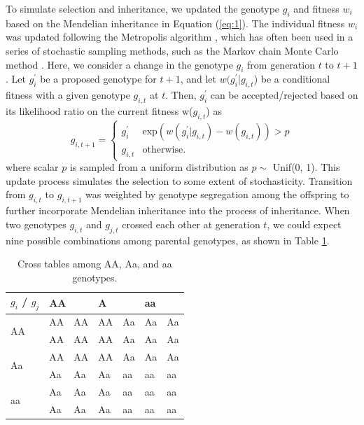 \documentclass[12pt,]{article}
\begin{document}
To simulate selection and inheritance, we updated the genotype $g_i$ and fitness $w_i$ based on the Mendelian inheritance in Equation (\ref{eq:1}). The individual fitness $w_i$ was updated following the Metropolis algorithm \citep{metropolis1953equation}, which has often been used in a series of stochastic sampling methods, such as the Markov chain Monte Carlo method \citep{bishop2006_11}. Here, we consider a change in the genotype $g_i$ from generation $t$ to $t+1$. Let $g^\prime_i$ be a proposed genotype for $t+1$, and let $w(g^\prime_i$|$g_{i,t}$) be a conditional fitness with a given genotype $g_{i,t}$ at $t$. Then, $g^\prime_i$ can be accepted/rejected based on its likelihood ratio on the current fitness w($g_{i,t}$) as
\[
  g_{i,t+1} = \begin{cases}
    g_i^\prime & \mathrm{exp}(w(g^\prime_i|g_{i,t}) - w(g_{i,t})) > p \\
    g_{i,t} & \mathrm{otherwise.}
  \end{cases}
\]
where scalar $p$ is sampled from a uniform distribution as $p \sim$ Unif(0, 1). This update process simulates the selection to some extent of stochasticity. Transition from $g_{i,t}$ to $g_{i,t+1}$ was weighted by genotype segregation among the offspring to further incorporate Mendelian inheritance into the process of inheritance. When two genotypes $g_{i,t}$ and $g_{j,t}$ crossed each other at generation $t$, we could expect nine possible combinations among parental genotypes, as shown in Table \ref{tableS1:MCMCinherit}.

\begin{table}[h]
\centering
\caption{Cross tables among AA, Aa, and aa genotypes.}
\begin{tabular}{|l|ll|ll|ll|}
\hline
$g_i$ / $g_j$             & \multicolumn{2}{l|}{AA} & \multicolumn{2}{l|}{ A } & \multicolumn{2}{l|}{aa} \\ \hline
\multirow{2}{*}{AA} & AA         & AA         & AA         & Aa         & Aa         & Aa         \\
                    & AA         & AA         & AA         & Aa         & Aa         & Aa         \\ \hline
\multirow{2}{*}{Aa} & AA         & AA         & AA         & Aa         & Aa         & Aa         \\
                    & Aa         & Aa         & Aa         & aa         & aa         & aa         \\ \hline
\multirow{2}{*}{aa} & Aa         & Aa         & Aa         & aa         & aa         & aa         \\
                    & Aa         & Aa         & Aa         & aa         & aa         & aa         \\ \hline
\end{tabular}
  \label{tableS1:MCMCinherit}
\end{table}
\end{document}

